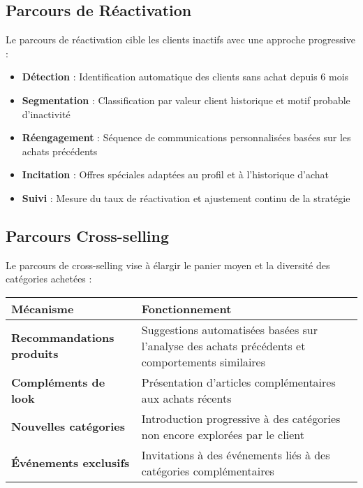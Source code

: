 \subsection{Parcours de Réactivation}

\begin{mdframed}[backgroundcolor=lightgreen!20, linewidth=1pt]
Le parcours de réactivation cible les clients inactifs avec une approche progressive :

\begin{itemize}
    \item \textbf{Détection} : Identification automatique des clients sans achat depuis 6 mois
    \item \textbf{Segmentation} : Classification par valeur client historique et motif probable d'inactivité
    \item \textbf{Réengagement} : Séquence de communications personnalisées basées sur les achats précédents
    \item \textbf{Incitation} : Offres spéciales adaptées au profil et à l'historique d'achat
    \item \textbf{Suivi} : Mesure du taux de réactivation et ajustement continu de la stratégie
\end{itemize}
\end{mdframed}

\subsection{Parcours Cross-selling}

Le parcours de cross-selling vise à élargir le panier moyen et la diversité des catégories achetées :

\begin{center}
\begin{tabular}{|>{\bfseries}p{4cm}|p{9.5cm}|}
\hline
\rowcolor{lightblue} Mécanisme & Fonctionnement \\
\hline
Recommandations produits & Suggestions automatisées basées sur l'analyse des achats précédents et comportements similaires \\
\hline
Compléments de look & Présentation d'articles complémentaires aux achats récents \\
\hline
Nouvelles catégories & Introduction progressive à des catégories non encore explorées par le client \\
\hline
Événements exclusifs & Invitations à des événements liés à des catégories complémentaires \\
\hline
\end{tabular}
\end{center}


